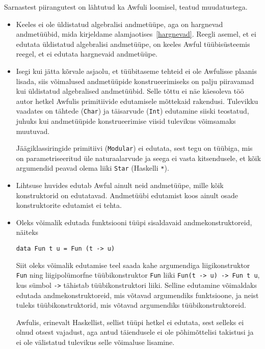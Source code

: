 \documentclass[12pt]{article}
\begin{document}
        Sarnastest piirangutest on lähtutud ka Awfuli loomisel, teatud muudatustega.

        \begin{itemize}
          \item
            Keeles ei ole üldistatud algebralisi andmetüüpe, aga on hargnevad andmetüübid, mida kirjeldame alamjaotises~\ref{hargnevad}. Reegli asemel, et ei edutata üldistatud algebralisi andmetüüpe, on keeles Awful tüübisüsteemis reegel, et ei edutata hargnevaid andmetüüpe.
          \item
            Isegi kui jätta kõrvale asjaolu, et tüübitaseme tehteid ei ole Awfulisse plaanis lisada, siis võimalused andmetüüpide konstrueerimiseks on palju piiravamad kui üldistatud algebralised andmetüübid. Selle tõttu ei näe käesoleva töö autor hetkel Awfulis primitiivide edutamisele mõttekaid rakendusi. Tulevikku vaadates on tähtede (\verb!Char!) ja täisarvude (\verb!Int!) edutamine siiski teostatud, juhuks kui andmetüüpide konstrueerimise viisid tulevikus võimsamaks muutuvad.

            Jäägiklassiringide primitiivi (\verb!Modular!) ei edutata, sest tegu on tüübiga, mis on parametriseeritud üle naturaalarvude ja seega ei vasta kitsendusele, et kõik argumendid peavad olema liiki \verb!Star! (Haskelli \verb!*!).
          \item
            Lihtsuse huvides edutab Awful ainult neid andmetüüpe, mille kõik konstruktorid on edutatavad. Andmetüübi edutamist koos ainult osade konstruktorite edutamist ei tehta.
          \item
            Oleks võimalik edutada funktsiooni tüüpi sisaldavaid andmekonstruktoreid, näiteks

            \begin{verbatim}data Fun t u = Fun (t -> u)\end{verbatim}

            Siit oleks võimalik edutamise teel saada kahe argumendiga liigikonstruktor \verb!Fun! ning liigipolümorfne tüübikonstruktor \verb!Fun! liiki \verb!Fun(t -> u) -> Fun t u!, kus sümbol \verb!->! tähistab tüübikonstruktori liiki. Selline edutamine võimaldaks edutada andmekonstruktoreid, mis võtavad argumendiks funktsioone, ja neist tuleks tüübikonstruktorid, mis võtavad argumendiks tüübikonstruktoreid.

            Awfulis, erinevalt Haskellist, sellist tüüpi hetkel ei edutata, sest selleks ei olnud otsest vajadust, aga antud täiendusele ei ole põhimõttelisi takistusi ja ei ole välistatud tulevikus selle võimaluse lisamine.
        \end{itemize}
\end{document}
